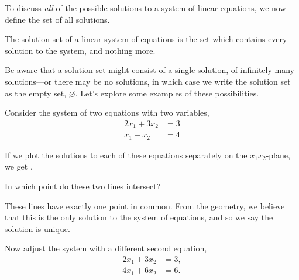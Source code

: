 \documentclass{ximera}
\begin{document}
To discuss \textit{all} of the possible solutions to a system of linear equations, we now define the set of all solutions.

\begin{definition}
  The solution set of a linear system of equations is the set which contains every solution to the system, and nothing more.
\end{definition}


\begin{problem}
  Be aware that a solution set might consist of a single solution, of infinitely many solutions---or there may be no solutions, in which case we write the solution set as the empty set, $\varnothing$.  Let's explore some examples of these possibilities.
  
  \begin{example}
    Consider the system of two equations with two variables,
    \begin{align*}
      2x_1+3x_2&=3\\
      x_1-x_2&=4
    \end{align*}
    
    \begin{question}
      If we plot the solutions to each of these equations separately on the
      $x_{1}x_{2}$-plane, we get .
    \end{question}

    \begin{question}
      In which point do these two lines intersect?
      \begin{multipleChoice}
      \end{multipleChoice}

      \begin{feedback}
        These lines have exactly one point in common.  From the geometry, we believe that this is the only solution to the system of equations, and so we say the solution is unique.
      \end{feedback}
    \end{question}
  \end{example}

  \begin{example}
    Now adjust the system with a different second equation,
    \begin{align*}
      2x_1+3x_2&=3,\\
      4x_1+6x_2&=6.
    \end{align*}


\end{example}
\end{problem}
\end{document}
